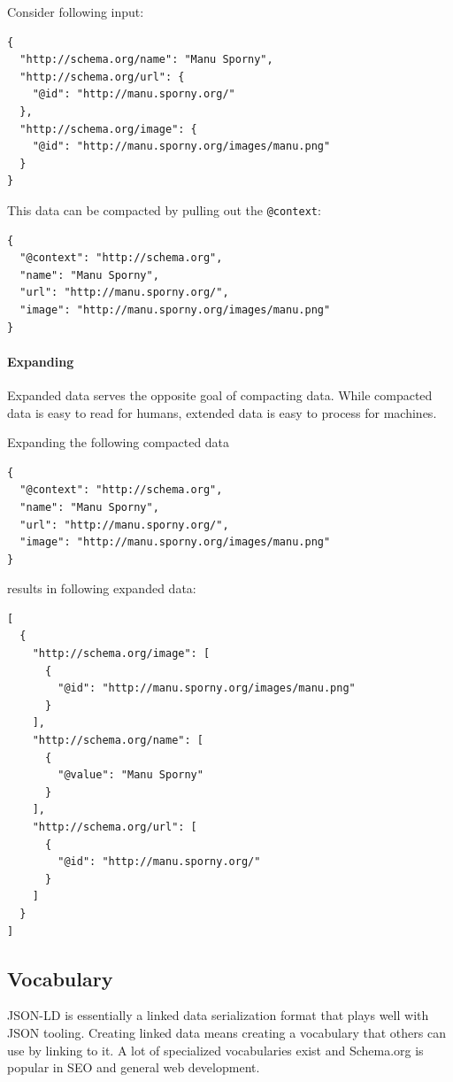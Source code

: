 Consider following input:

\lstset{language=JSON}
\begin{lstlisting}[caption=Verbose data of a person]
{
  "http://schema.org/name": "Manu Sporny",
  "http://schema.org/url": {
    "@id": "http://manu.sporny.org/"
  },
  "http://schema.org/image": {
    "@id": "http://manu.sporny.org/images/manu.png"
  }
}
\end{lstlisting}

This data can be compacted by pulling out the \lstinline{@context}:

\lstset{language=JSON}
\begin{lstlisting}[caption=Compacted and easy-to-read data of a person]
{
  "@context": "http://schema.org",
  "name": "Manu Sporny",
  "url": "http://manu.sporny.org/",
  "image": "http://manu.sporny.org/images/manu.png"
}
\end{lstlisting}

\paragraph{Expanding}\label{jsonldextending}
Expanded data serves the opposite goal of compacting data. While compacted data is easy to read for humans, extended data is easy to process for machines.

Expanding the following compacted data

\lstset{language=JSON}
\begin{lstlisting}[caption=Compacted and easy-to-read data of a person]
{
  "@context": "http://schema.org",
  "name": "Manu Sporny",
  "url": "http://manu.sporny.org/",
  "image": "http://manu.sporny.org/images/manu.png"
}
\end{lstlisting}

results in following expanded data:

\lstset{language=JSON}
\begin{lstlisting}[caption=Expanded data of a person that is easy to process for machines]
[
  {
    "http://schema.org/image": [
      {
        "@id": "http://manu.sporny.org/images/manu.png"
      }
    ],
    "http://schema.org/name": [
      {
        "@value": "Manu Sporny"
      }
    ],
    "http://schema.org/url": [
      {
        "@id": "http://manu.sporny.org/"
      }
    ]
  }
]
\end{lstlisting}

\subsection{Vocabulary}
JSON-LD is essentially a linked data serialization format that plays well with JSON tooling. Creating linked data means creating a vocabulary that others can use by linking to it. A lot of specialized vocabularies exist and Schema.org is popular in SEO and general web development.

